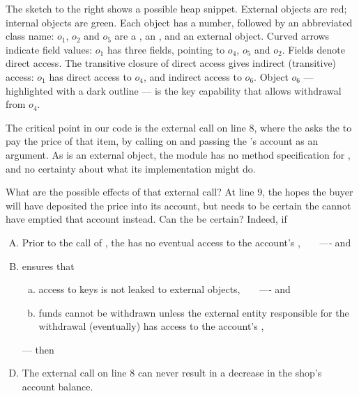 \noindent The sketch to the right shows a possible heap snippet.
External objects are red; internal objects are green.
%
Each object has a number,
followed by an abbreviated class name: $o_1$, $o_2$ and $o_5$ are a , an , and an external object. 
Curved arrows
indicate field values: $o_1$ has three fields, pointing to 
$o_4$, $o_5$ and $o_2$.
%
Fields denote direct access. The transitive closure of direct access
gives indirect (transitive) access: $o_1$ has direct access to $o_4$, and indirect access to $o_6$.
%
Object $o_6$ ---
highlighted with a dark outline
---
is the key capability that allows withdrawal from $o_4$.

The critical point in our code is the external call on line 8,   where the  asks the  to pay the price of that item,
by calling   on  and passing the 's account as an argument.
As  is an external object, the module \Mshop has no method specification for , and no 
certainty about what its implementation %
might do. 


What are the possible effects of that external call?
At line 9, the  hopes
the buyer will have deposited the price into its account, 
but needs to be certain the  cannot
have emptied that account instead. 
%
Can the   be certain? Indeed, if

\vspace{.05cm}
\begin{enumerate}[(A)]
\item   Prior to the call of  , the   has no eventual access to the account's \password, \ \ \ \emph{----} and
\item  \Mshop ensures that 
\begin{enumerate}[(a)]
\item access to keys is not leaked to external objects, \ \ \ \emph{----} and
\item   funds cannot be withdrawn unless the external entity responsible for the withdrawal (eventually) has  access to the account's \password,
\end{enumerate}
\item[--- then]
\item  The external  call on line 8 can never result in a decrease in the shop's account balance.
\end{enumerate}


